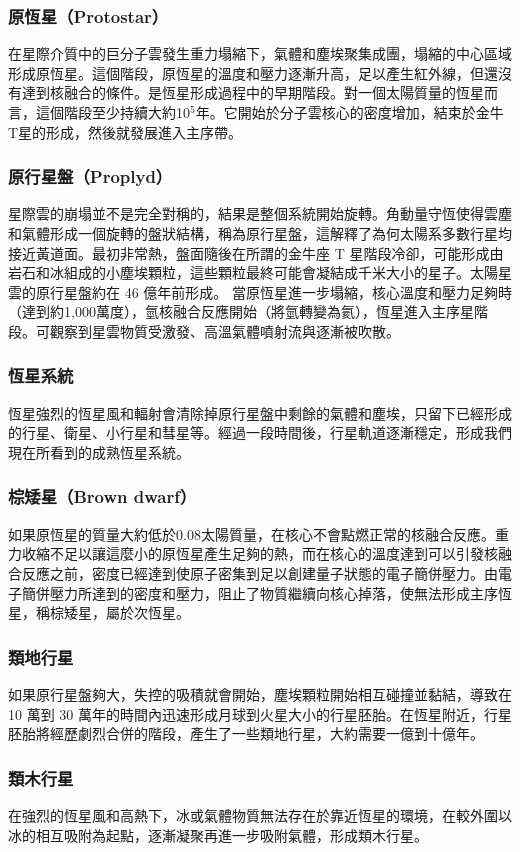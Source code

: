 \documentclass[a4paper,12pt]{report}
\begin{document}
\subsubsection{原恆星（Protostar）}
在星際介質中的巨分子雲發生重力塌縮下，氣體和塵埃聚集成團，塌縮的中心區域形成原恆星。這個階段，原恆星的溫度和壓力逐漸升高，足以產生紅外線，但還沒有達到核融合的條件。是恆星形成過程中的早期階段。對一個太陽質量的恆星而言，這個階段至少持續大約10$^5$年。它開始於分子雲核心的密度增加，結束於金牛T星的形成，然後就發展進入主序帶。
\subsubsection{原行星盤（Proplyd）}
星際雲的崩塌並不是完全對稱的，結果是整個系統開始旋轉。角動量守恆使得雲塵和氣體形成一個旋轉的盤狀結構，稱為原行星盤，這解釋了為何太陽系多數行星均接近黃道面。最初非常熱，盤面隨後在所謂的金牛座 T 星階段冷卻，可能形成由岩石和冰組成的小塵埃顆粒，這些顆粒最終可能會凝結成千米大小的星子。太陽星雲的原行星盤約在 46 億年前形成。
當原恆星進一步塌縮，核心溫度和壓力足夠時（達到約1,000萬度），氫核融合反應開始（將氫轉變為氦），恆星進入主序星階段。可觀察到星雲物質受激發、高溫氣體噴射流與逐漸被吹散。
\subsubsection{恆星系統}
恆星強烈的恆星風和輻射會清除掉原行星盤中剩餘的氣體和塵埃，只留下已經形成的行星、衛星、小行星和彗星等。經過一段時間後，行星軌道逐漸穩定，形成我們現在所看到的成熟恆星系統。
\subsubsection{棕矮星（Brown dwarf）}
如果原恆星的質量大約低於0.08太陽質量，在核心不會點燃正常的核融合反應。重力收縮不足以讓這麼小的原恆星產生足夠的熱，而在核心的溫度達到可以引發核融合反應之前，密度已經達到使原子密集到足以創建量子狀態的電子簡併壓力。由電子簡併壓力所達到的密度和壓力，阻止了物質繼續向核心掉落，使無法形成主序恆星，稱棕矮星，屬於次恆星。
\subsubsection{類地行星}
如果原行星盤夠大，失控的吸積就會開始，塵埃顆粒開始相互碰撞並黏結，導致在 10 萬到 30 萬年的時間內迅速形成月球到火星大小的行星胚胎。在恆星附近，行星胚胎將經歷劇烈合併的階段，產生了一些類地行星，大約需要一億到十億年。
\subsubsection{類木行星}
在強烈的恆星風和高熱下，冰或氣體物質無法存在於靠近恆星的環境，在較外圍以冰的相互吸附為起點，逐漸凝聚再進一步吸附氣體，形成類木行星。
\end{document}
